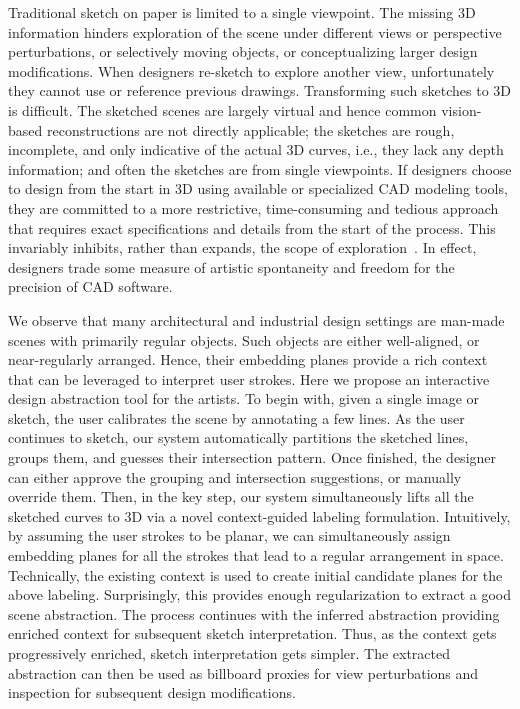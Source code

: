 Traditional sketch on paper is limited to a single viewpoint. The missing 3D information hinders exploration of the scene under different views or perspective perturbations, or selectively moving objects, or conceptualizing larger design modifications.  When designers re-sketch to explore another view, unfortunately they cannot use or reference previous drawings. Transforming such sketches to 3D is difficult. The sketched scenes are largely virtual and hence common vision-based reconstructions are not directly applicable; the sketches are rough, incomplete, and only indicative of the actual 3D curves, i.e., they lack any depth information; and often the sketches are from single viewpoints. If designers choose to design from the start in 3D using available or specialized CAD modeling tools, they are committed to a more restrictive, time-consuming and tedious approach that requires exact specifications and details from the start of the process. This invariably inhibits, rather than expands, the scope of exploration~\cite{sketchBook:11}. In effect, designers trade some measure of artistic spontaneity and freedom for the precision of CAD software.

We observe that many architectural and industrial design settings are man-made scenes with primarily regular objects. Such objects are either well-aligned, or near-regularly arranged. Hence, their embedding planes provide a rich context that can be leveraged to interpret user strokes. Here we propose an interactive design abstraction tool for the artists. To begin with, given a single image or sketch, the user calibrates the scene by annotating a few lines. As the user continues to sketch, our system automatically partitions the sketched lines, groups them, and guesses their intersection pattern. Once finished, the designer can either approve the grouping and intersection suggestions, or manually override them. Then, in the key step, our system simultaneously lifts all the sketched curves to 3D via a novel context-guided labeling formulation. Intuitively, by assuming the user strokes to be planar, we can simultaneously assign embedding planes for all the strokes that lead to a regular arrangement in space. Technically, the existing context is used to create initial candidate planes for the above labeling. Surprisingly, this provides enough regularization to extract a good scene abstraction. The process continues with the inferred abstraction providing enriched context for subsequent sketch interpretation. Thus, as the context gets progressively enriched, sketch interpretation gets simpler. The extracted abstraction can then be used as billboard proxies for view perturbations and  inspection for subsequent design modifications.


